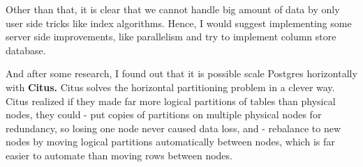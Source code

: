 \documentclass[11pt]{article}
\begin{document}
    Other than that, it is clear that we cannot handle big amount of data by
only user side tricks like index algorithms. Hence, I would suggest
implementing some server side improvements, like parallelism and try to
implement column store database.

And after some research, I found out that it is possible scale Postgres
horizontally with \textbf{Citus.} Citus solves the horizontal
partitioning problem in a clever way. Citus realized if they made far
more logical partitions of tables than physical nodes, they could - put
copies of partitions on multiple physical nodes for redundancy, so
losing one node never caused data loss, and - rebalance to new nodes by
moving logical partitions automatically between nodes, which is far
easier to automate than moving rows between nodes.


    
    
    
    
\end{document}
